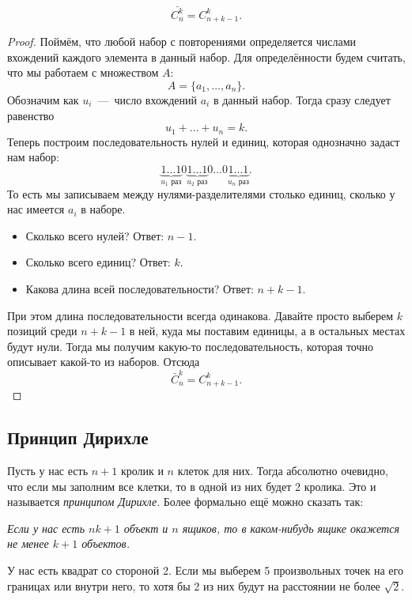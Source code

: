 \begin{theorem}
	\[
		\bar{C_n^k} = C_{n + k - 1}^k.
	\]
\end{theorem}

\begin{proof}
	Поймём, что любой набор с повторениями определяется числами вхождений каждого элемента в данный набор. Для определённости будем считать, что мы работаем с множеством $A$:
	\[
		A = \{a_1, \dots, a_n\}.
	\]
	Обозначим как $u_i$~---~число вхождений $a_i$ в данный набор. Тогда сразу следует равенство
	\[
		u_1 + \ldots + u_n = k.
	\]
	Теперь построим последовательность нулей и единиц, которая однозначно задаст нам набор:
	\[
		\underbrace{1 \ldots 1}_{u_1 \text{ раз}}
		0
		\underbrace{1 \ldots 1}_{u_2 \text{ раз}}
		0 \ldots 0
		\underbrace{1 \ldots 1}_{u_n \text{ раз}}.
	\]
	То есть мы записываем между нулями-разделителями столько единиц, сколько у нас имеется $a_i$ в наборе.
	\begin{itemize}
		\item Сколько всего нулей? Ответ: $n - 1$.
		\item Сколько всего единиц? Ответ: $k$.
		\item Какова длина всей последовательности? Ответ: $n + k - 1$.
	\end{itemize}
	При этом длина последовательности всегда одинакова. Давайте просто выберем $k$ позиций среди $n + k - 1$ в ней, куда мы поставим единицы, а в остальных местах будут нули. Тогда мы получим какую-то последовательность, которая точно описывает какой-то из наборов. Отсюда
	\[
		\bar{C}_n^k = C_{n + k - 1}^k.
	\]
\end{proof}

\subsection{Принцип Дирихле}

\begin{definition}
	Пусть у нас есть $n + 1$ кролик и $n$ клеток для них. Тогда абсолютно очевидно, что если мы заполним все клетки, то в одной из них будет 2 кролика. Это и называется \textit{принципом Дирихле}. Более формально ещё можно сказать так:
	
	\textit{
	Если у нас есть $nk + 1$ объект и $n$ ящиков, то в каком-нибудь ящике окажется не менее $k + 1$ объектов.
	}
\end{definition}

\begin{example}
	У нас есть квадрат со стороной 2. Если мы выберем 5 произвольных точек на его границах или внутри него, то хотя бы 2 из них будут на расстоянии не более $\sqrt{2}$.
\end{example}

